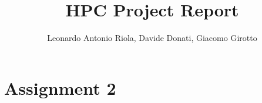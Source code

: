 \documentclass[11pt,a4paper]{article}
\title{HPC Project Report}
\author{Leonardo Antonio Riola, Davide Donati, Giacomo Girotto}
\date{}
\begin{document}
\vspace{-1.5cm}
\maketitle
\vspace{-1cm}

\section{Assignment 2}



\newpage


\end{document}
